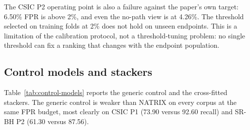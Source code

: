 \documentclass[preprint,11pt]{elsarticle}
\begin{document}
The CSIC P2 operating point is also a failure against the paper's own
target: 6.50\% FPR is above 2\%, and even the no-path view is at 4.26\%.
The threshold selected on training folds at 2\% does not hold on unseen
endpoints. This is a limitation of the calibration protocol, not a
threshold-tuning problem: no single threshold can fix a ranking that
changes with the endpoint population.

\subsection{Control models and
stackers}\label{control-models-and-stackers}

Table~\ref{tab:control-models} reports the generic control and the cross-fitted stackers. The
generic control is weaker than NATRIX on every corpus at the same FPR
budget, most clearly on CSIC P1 (73.90 versus 92.60 recall) and SR-BH P2
(61.30 versus 87.56).
\end{document}
